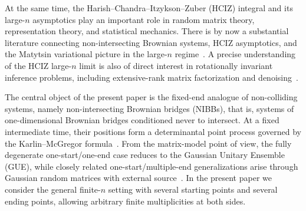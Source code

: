 \documentclass[11pt,a4paper]{article}
\theoremstyle{definition}\newtheorem{definition}[theorem]{Definition}
\theoremstyle{remark}\newtheorem{remark}[theorem]{Remark}
\numberwithin{equation}{section}
\begin{document}
At the same time, the Harish--Chandra--Itzykson--Zuber (HCIZ) integral and its large-$n$ asymptotics play an important role in random matrix theory, representation theory, and statistical mechanics. There is by now a substantial literature connecting non-intersecting Brownian systems, HCIZ asymptotics, and the Matytsin variational picture in the large-$n$ regime~\cite{GuionnetMaida2005,BunBouchaudMajumdarPotters2014,GrelaMajumdarSchehr2021}.  A precise understanding of the HCIZ large-$n$ limit is also of direct interest in rotationally invariant inference problems, including extensive-rank matrix factorization and denoising~\cite{MaillardKrzakalaMezardZdeborova2022,TroianiErbaKrzakalaMaillardZdeborova2022}.

The central object of the present paper is the fixed-end analogue of non-colliding systems, namely non-intersecting Brownian bridges (NIBBs), that is, systems of one-dimensional Brownian bridges conditioned never to intersect. At a fixed intermediate time, their positions form a determinantal point process governed by the Karlin--McGregor formula~\cite{KarlinMcGregor1959}. From the matrix-model point of view, the fully degenerate one-start/one-end case reduces to the Gaussian Unitary Ensemble (GUE), while closely related one-start/multiple-end generalizations arise through Gaussian random matrices with external source~\cite{BrezinHikami1998}. In the present paper we consider the general finite-$n$ setting with several starting points and several ending points, allowing arbitrary finite multiplicities at both sides.

 
\end{document}

